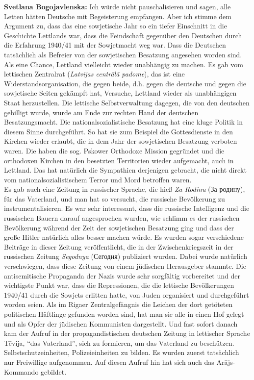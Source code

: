 \textbf{Svetlana Bogojavlenska:} Ich würde nicht pauschalisieren und sagen, alle Letten hätten Deutsche mit Begeisterung empfangen. Aber ich stimme dem Argument zu, dass das eine sowjetische Jahr so ein tiefer Einschnitt in die Geschichte Lettlands war, dass die Feindschaft gegenüber den Deutschen durch die Erfahrung 1940/41 mit der Sowjetmacht weg war. Dass die Deutschen tatsächlich als Befreier von der sowjetischen Besatzung angesehen worden sind. Als eine Chance, Lettland vielleicht wieder unabhängig zu machen. Es gab vom lettischen Zentralrat (\textit{Latvijas centrālā padome}), das ist eine Widerstandsorganisation, die gegen beide, d.h. gegen die deutsche und gegen die sowjetische Seiten gekämpft hat, Versuche, Lettland wieder als unabhängigen Staat herzustellen. Die lettische Selbstverwaltung dagegen, die von den deutschen gebilligt wurde, wurde am Ende zur rechten Hand der deutschen Besatzungsmacht. Die nationalsozialistische Besatzung hat eine kluge Politik in diesem Sinne durchgeführt. So hat sie zum Beispiel die Gottesdienste in den Kirchen wieder erlaubt, die in dem Jahr der sowjetischen Besatzung verboten waren. Die haben die sog. Pskower Orthodoxe Mission gegründet und die orthodoxen Kirchen in den besetzten Territorien wieder aufgemacht, auch in Lettland. Das hat natürlich die Sympathien derjenigen gebracht, die nicht direkt vom nationalsozialistischem Terror und Mord betroffen waren.\\
Es gab auch eine Zeitung in russischer Sprache, die hieß \textit{Za Rodinu} (За родину), für das Vaterland, und man hat so versucht, die russische Bevölkerung zu instrumentalisieren. Es war sehr interessant, dass die russische Intelligenz und die russischen Bauern darauf angesprochen wurden, wie schlimm es der russischen Bevölkerung während der Zeit der sowjetischen Besatzung ging und dass der große Hitler natürlich alles besser machen würde. Es wurden sogar verschiedene Beiträge in dieser Zeitung veröffentlicht, die in der Zwischenkriegszeit in der russischen Zeitung \textit{Segodnya} (Сегодня) publiziert wurden. Dabei wurde natürlich verschwiegen, dass diese Zeitung von einem jüdischen Herausgeber stammte. 
Die antisemitische Propaganda der Nazis wurde sehr sorgfältig vorbereitet und der wichtigste Punkt war, dass die Repressionen, die die lettische Bevölkerungen 1940/41 durch die Sowjets erlitten hatte, von Juden organisiert und durchgeführt worden seien. Als im Rigaer Zentralgefängnis die Leichen der dort getöteten politischen Häftlinge gefunden worden sind, hat man sie alle in einen Hof gelegt und als Opfer der jüdischen Kommunisten dargestellt. Und fast sofort danach kam der Aufruf in der propagandistischen deutschen Zeitung in lettischer Sprache Tēvija, “das Vaterland”, sich zu formieren, um das Vaterland zu beschützen. Selbstschutzeinheiten, Polizeieinheiten zu bilden. Es wurden zuerst tatsächlich nur Freiwillige aufgenommen. Auf diesen Aufruf hin hat sich auch das Arājs-Kommando gebildet.

